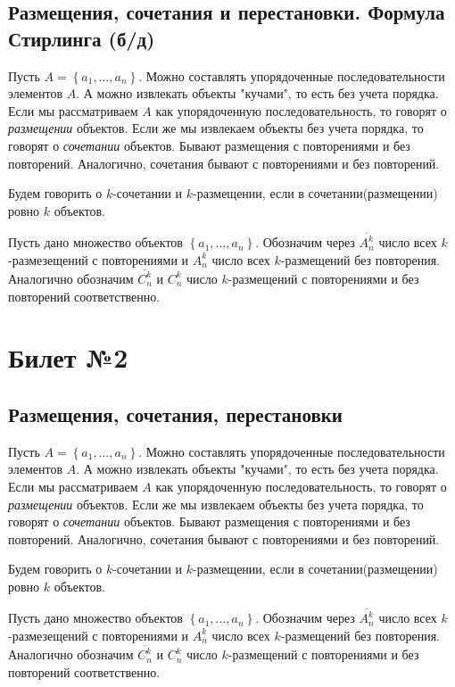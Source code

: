 \documentclass[a4paper]{article}
\theoremstyle{plain}
\theoremstyle{remark}
\theoremstyle{definition}
\newcommand{\myset}[1]{\left\{ #1 \right\}}
\begin{document}
\subsection{Размещения, сочетания и перестановки. Формула Стирлинга (б/д)}

Пусть $A = \myset{a_1, \ldots, a_n}$. Можно составлять упорядоченные последовательности элементов $A$. А можно извлекать объекты "кучами", то есть без учета порядка. 
Если мы рассматриваем $A$ как упорядоченную последовательность, то говорят о \emph{размещении} объектов. 
Если же мы извлекаем объекты без учета порядка, то говорят о \emph{сочетании} объектов. Бывают размещения с повторениями и без повторений. 
Аналогично, сочетания бывают с повторениями и без повторений.

Будем говорить о $k$-сочетании и $k$-размещении, если в сочетании(размещении) ровно $k$ объектов.

Пусть дано множество объектов $\myset{a_1, \ldots, a_n}$. 
Обозначим через $\overline{A_n^k}$ число всех $k$-размезещений с повторениями и $A_n^k$ число всех $k$-размещений без повторения.
Аналогично обозначим $\overline{C_n^k}$ и $C_n^k$ число $k$-размещений с повторениями и без повторений соответственно.


\section{Билет №2}
\subsection{Размещения, сочетания, перестановки}
Пусть $A = \myset{a_1, \ldots, a_n}$. Можно составлять упорядоченные последовательности элементов $A$. А можно извлекать объекты "кучами", то есть без учета порядка. 
Если мы рассматриваем $A$ как упорядоченную последовательность, то говорят о \emph{размещении} объектов. 
Если же мы извлекаем объекты без учета порядка, то говорят о \emph{сочетании} объектов. Бывают размещения с повторениями и без повторений. 
Аналогично, сочетания бывают с повторениями и без повторений.

Будем говорить о $k$-сочетании и $k$-размещении, если в сочетании(размещении) ровно $k$ объектов.

Пусть дано множество объектов $\myset{a_1, \ldots, a_n}$. 
Обозначим через $\overline{A_n^k}$ число всех $k$-размезещений с повторениями и $A_n^k$ число всех $k$-размещений без повторения.
Аналогично обозначим $\overline{C_n^k}$ и $C_n^k$ число $k$-размещений с повторениями и без повторений соответственно.
\end{document}
